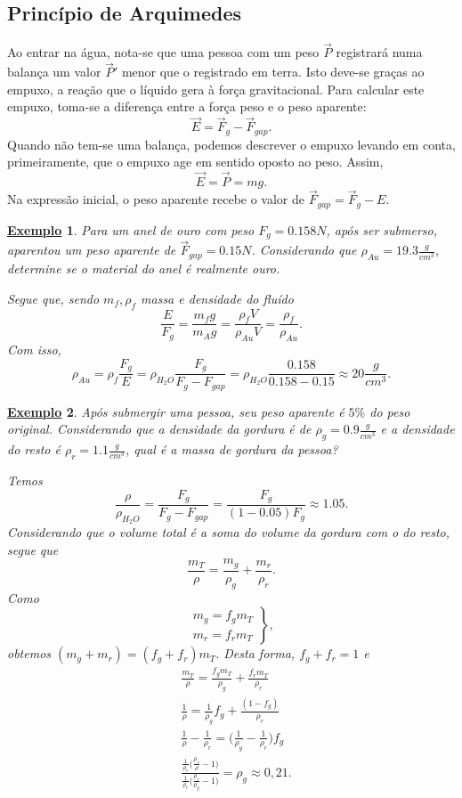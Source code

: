 \documentclass{article}
\newtheorem{example}{\underline{Exemplo}}
\begin{document}
\subsection{Princípio de Arquimedes}
  Ao entrar na água, nota-se que uma pessoa com um peso \(\vec{P}\) registrará numa balança um valor \(\vec{P}'\) menor que o registrado em terra. Isto deve-se graças ao empuxo,
a reação que o líquido gera à força gravitacional. Para calcular este empuxo, toma-se a diferença entre a força peso e o peso aparente: 
  \[
    \vec{E} = \vec{F}_{g}-\vec{F}_{gap}.
  \]
  Quando não tem-se uma balança, podemos descrever o empuxo levando em conta, primeiramente, que o empuxo age em sentido oposto ao peso. Assim, 
  \[
    \vec{E} = \vec{P} = mg.
  \]
  Na expressão inicial, o peso aparente recebe o valor de \(\vec{F}_{gap}=\vec{F}_{g} - E\).
 \begin{example}
   Para um anel de ouro com peso \(F_{g} = 0.158N\), após ser submerso, aparentou um peso aparente de \(\vec{F}_{gap}=0.15N\). Considerando que
  \(\rho_{Au} = 19.3\frac{g}{cm^{3}},\) determine se o material do anel é realmente ouro.

  Segue que, sendo \(m_{f}, \rho_{f}\) massa e densidade do fluído
    \[
      \frac{E}{F_{g}} = \frac{m_{f}g}{m_{A}g} = \frac{\rho_{f}V}{\rho_{Au}V} = \frac{\rho_{f}}{\rho_{Au}}.
    \]
  Com isso, 
    \[
      \rho_{Au} = \rho_{f}\frac{F_{g}}{E} = \rho_{H_{2}O}\frac{F_{g}}{F_{g}-F_{gap}}=\rho_{H_{2}O}\frac{0.158}{0.158-0.15}\approx 20\frac{g}{cm^{3}}.
    \]
 \end{example}
\begin{example}
  Após submergir uma pessoa, seu peso aparente é \(5\%\) do peso original. Considerando que a densidade da gordura é de
 \(\rho_{g} = 0.9 \frac{g}{cm^{3}}\) e a densidade do resto é \(\rho_{r} = 1.1 \frac{g}{cm^{3}}\), qual é a massa de gordura da pessoa?

  Temos 
    \[
      \frac{\rho }{\rho_{H_{2}O}} = \frac{F_{g}}{F_{g}-F_{gap}} = \frac{F_{g}}{(1-0.05)F_{g}}\approx 1.05.
    \]
    Considerando que o volume total é a soma do volume da gordura com o do resto, segue que 
      \[
        \frac{m_{T}}{\rho }= \frac{m_{g}}{\rho_{g}}+\frac{m_{r}}{\rho_{r}}.
      \]
    Como 
      \[
         \left.\begin{array}{ll}
            m_{g} = f_{g}m_{T}\\
            m_{r} = f_{r}m_{T}
          \end{array}\right\},
      \]
    obtemos \((m_{g}+m_{r}) = (f_{g}+f_{r})m_{T}.\) Desta forma, \(f_{g}+f_{r}=1\) e
   \begin{align*}
     &\frac{m_{T}}{\rho } = \frac{f_{g}m_{T}}{\rho_{g}} + \frac{f_{r}m_{T}}{\rho_{r}}\\
     &\frac{1}{\rho }=\frac{1}{\rho_{g}}f_{g} + \frac{(1-f_{g})}{\rho_{r}}\\
     &\frac{1}{\rho }-\frac{1}{\rho_{r}}=\biggl(\frac{1}{\rho_{g}}-\frac{1}{\rho_{r}}\biggr)f_{g}\\
     &\frac{\frac{1}{\rho_{r}}\biggl(\frac{\rho_{r}}{\rho }-1\biggr)}{\frac{1}{\rho_{r}}\biggl(\frac{\rho_{r}}{\rho_{g}}-1\biggr)} = \rho_{g}\approx0,21.
   \end{align*}
\end{example}
\newpage
\end{document}
